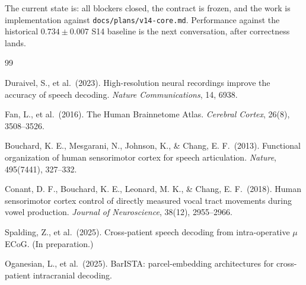 \documentclass[11pt,letterpaper]{article}
\begin{document}
The current state is: all blockers closed, the contract is frozen, and the work is implementation against \texttt{docs/plans/v14-core.md}. Performance against the historical $0.734 \pm 0.007$ S14 baseline is the next conversation, after correctness lands.


\small
\begin{thebibliography}{99}\raggedright
\setlength{\itemsep}{2pt}

Duraivel, S., et al.\ (2023).
High-resolution neural recordings improve the accuracy of speech decoding.
\textit{Nature Communications}, 14, 6938.

Fan, L., et al.\ (2016).
The Human Brainnetome Atlas.
\textit{Cerebral Cortex}, 26(8), 3508--3526.

Bouchard, K. E., Mesgarani, N., Johnson, K., \& Chang, E. F.\ (2013).
Functional organization of human sensorimotor cortex for speech articulation.
\textit{Nature}, 495(7441), 327--332.

Conant, D. F., Bouchard, K. E., Leonard, M. K., \& Chang, E. F.\ (2018).
Human sensorimotor cortex control of directly measured vocal tract movements during vowel production.
\textit{Journal of Neuroscience}, 38(12), 2955--2966.

Spalding, Z., et al.\ (2025).
Cross-patient speech decoding from intra-operative $\mu$ECoG.
(In preparation.)

Oganesian, L., et al.\ (2025).
BarISTA: parcel-embedding architectures for cross-patient intracranial decoding.

\end{thebibliography}
\end{document}
